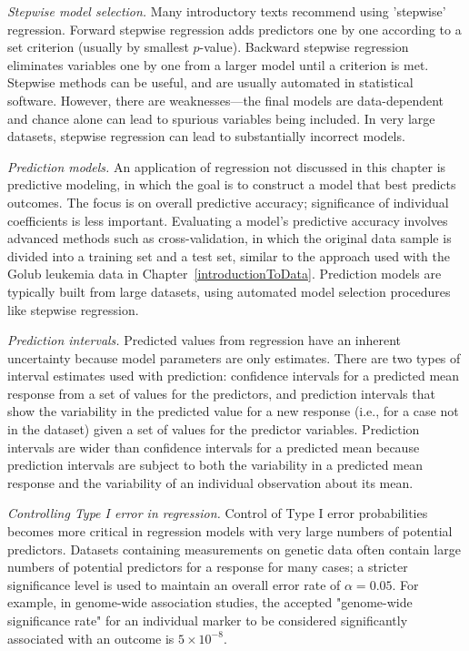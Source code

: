 \begin{description}
	\item \emph{Stepwise model selection.} Many introductory texts recommend using 'stepwise' regression. Forward stepwise regression adds predictors one by one according to a set criterion (usually by smallest $p$-value). Backward stepwise regression eliminates variables one by one from a larger model until a criterion is met. Stepwise methods can be useful, and are usually automated in statistical software. However, there are weaknesses---the final models are data-dependent and chance alone can lead to spurious variables being included. In very large datasets, stepwise regression can lead to substantially incorrect models.
	
	\item \emph{Prediction models.} An application of regression not discussed in this chapter is predictive modeling, in which the goal is to construct a model that best predicts outcomes. The focus is on overall predictive accuracy; significance of individual coefficients is less important. Evaluating a model's predictive accuracy involves advanced methods such as cross-validation, in which the original data sample is divided into a training set and a test set, similar to the approach used with the Golub leukemia data in Chapter~\ref{introductionToData}. Prediction models are typically built from large datasets, using automated model selection procedures like stepwise regression.
	
	\item \emph{Prediction intervals.} Predicted values from regression have an inherent uncertainty because model parameters are only estimates. There are two types of interval estimates used with prediction: confidence intervals for a predicted mean response from a set of values for the predictors, and prediction intervals that show the variability in the predicted value for a new response (i.e., for a case not in the dataset) given a set of values for the predictor variables. Prediction intervals are wider than confidence intervals for a predicted mean because prediction intervals are subject to both the variability in a predicted mean response and the variability of an individual observation about its mean.
	
	\item \emph{Controlling Type I error in regression.} Control of Type I error probabilities becomes more critical in regression models with very large numbers of potential predictors. Datasets containing measurements on genetic data often contain large numbers of potential predictors for a response for many cases; a stricter significance level is used to maintain an overall error rate of $\alpha = 0.05$. For example, in genome-wide association studies, the accepted "genome-wide significance rate" for an individual marker to be considered significantly associated with an outcome is $5 \times 10^{-8}$.
	
\end{description}


